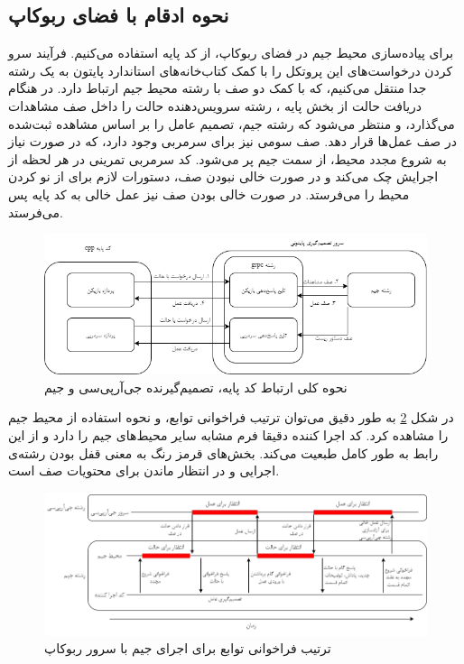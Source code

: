 \subsection{نحوه ادقام با فضای ربوکاپ}
برای پیاده‌سازی محیط جیم در فضای ربوکاپ، از کد پایه  استفاده می‌کنیم.
فرآیند سرو کردن درخواست‌های این پروتکل را با کمک کتاب‌خانه‌های استاندارد پایتون به یک رشته 
جدا منتقل می‌کنیم، که با کمک دو صف با رشته محیط جیم ارتباط دارد.
در هنگام دریافت حالت از بخش پایه ،
رشته سرویس‌دهنده حالت را داخل صف مشاهدات می‌گذارد، و منتظر می‌شود که رشته جیم، تصمیم عامل را بر اساس مشاهده ثبت‌شده در صف عمل‌ها قرار دهد.
صف سومی نیز برای سرمربی وجود دارد، که در صورت نیاز به شروع مجدد محیط، از سمت جیم پر می‌شود. 
کد سرمربی تمرینی در هر لحظه از اجرایش چک می‌کند و در صورت خالی نبودن صف، دستورات لازم برای از نو کردن محیط را می‌فرستد. در صورت خالی بودن صف نیز عمل خالی به کد پایه پس می‌فرستد.

\begin{figure}[H]
    \centering
    \includegraphics[width=1\textwidth]{images/grpc_gym.png}
    \caption{نحوه کلی ارتباط کد پایه، تصمیم‌گیرنده جی‌آر‌پی‌سی و جیم}\label{fig:gym_grpc}
\end{figure}
در شکل \ref{fig:gym_timing}
به طور دقیق می‌توان ترتیب فراخوانی توابع، و نحوه استفاده از محیط جیم را مشاهده کرد.
کد اجرا کننده 
دقیقا فرم مشابه سایر محیط‌های جیم را دارد و از این رابط به طور کامل طبعیت می‌کند.
بخش‌های قرمز رنگ به معنی قفل بودن رشته‌ی اجرایی و در انتظار ماندن برای محتویات صف است.
\begin{figure}[H]
    \centering
    \includegraphics[width=1\textwidth]{images/timing.drawio.png}
    \caption{ترتیب فراخوانی توابع برای اجرای جیم با سرور ربوکاپ}\label{fig:gym_timing}
\end{figure}

